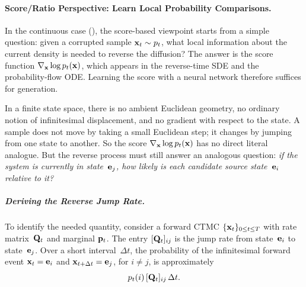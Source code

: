 \paragraph{Score/Ratio Perspective: Learn Local Probability Comparisons.}
In the continuous case (), the
score-based viewpoint starts from a simple question: given a corrupted
sample ${\mathbf{x}}_t \sim p_t$, what local information about the current density is needed to reverse the diffusion? The answer is the score function
$\nabla_{{\mathbf{x}}}\log p_t({\mathbf{x}})$, which appears in the reverse-time
SDE and the probability-flow ODE\@. Learning the score with a neural
network therefore suffices for generation.

In a finite state space, there is no ambient Euclidean geometry, no
ordinary notion of infinitesimal displacement, and no gradient with respect to the state. A sample does not move
by taking a small Euclidean step; it changes by jumping from one state to another.
So the score $\nabla_{{\mathbf{x}}}\log p_t({\mathbf{x}})$ has no direct literal analogue. But
the reverse process must still answer an analogous question: \emph{if the
system is currently in state~${\mathbf{e}}_j$, how likely is each candidate source state~${\mathbf{e}}_i$ relative to it?}

\subparagraph{Deriving the Reverse Jump Rate.}
To identify the needed quantity, consider a forward CTMC $\{{\mathbf{x}}_t\}_{0\leq t\leq T}$ with rate
matrix~${\mathbf{Q}}_t$ and marginal ${\mathbf{p}}_t$.  The entry $[{\mathbf{Q}}_t]_{ij}$ is the jump rate from
state~${\mathbf{e}}_i$ to state~${\mathbf{e}}_j$.  Over a short interval~$\Delta t$, the
probability of the infinitesimal forward event
${\mathbf{x}}_t={\mathbf{e}}_i$ and ${\mathbf{x}}_{t+\Delta t}={\mathbf{e}}_j$, for $i\neq j$, is approximately
\[
p_t(i)\,[{\mathbf{Q}}_t]_{ij}\,\Delta t.
\]

